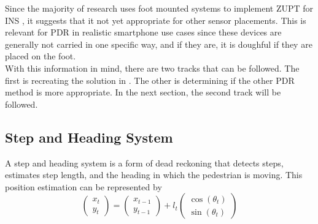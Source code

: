 Since the majority of research uses foot mounted systems to implement ZUPT for INS \cite{Wu2019}, it suggests that it not yet appropriate for other sensor placements. This is relevant for PDR in realistic smartphone use cases since these devices are generally not carried in one specific way, and if they are, it is doughful if they are placed on the foot. \\ With this information in mind, there are two tracks that can be followed. The first is recreating the solution in \cite{Solin2018a}. The other is determining if the other PDR method is more appropriate. In the next section, the second track will be followed. \\

\newpage
\subsection{Step and Heading System}
\label{sec:rw-SHS}
A step and heading system is a form of dead reckoning that detects steps, estimates step length, and the heading in which the pedestrian is moving. This position estimation can be represented by \cite{MunozDiaz2019}
\begin{equation}
	\label{eq:SHS_dynamic_model}
	\left(\begin{array}{l}
		x_t \\
		y_t
	\end{array}\right) 
	=
	\left(\begin{array}{l}
		x_{t-1} \\
		y_{t-1}
	\end{array}\right) 
	+l_{t} \left(\begin{array}{l}
		\cos \left(\theta_{t}\right) \\
		\sin \left(\theta_{t}\right)
	\end{array}\right)
\end{equation}


